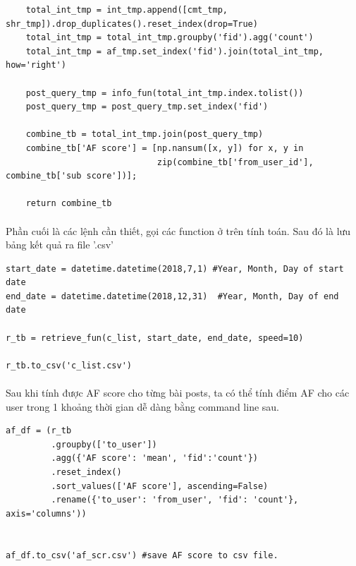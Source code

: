 \documentclass[12pt]{article}
\numberwithin{equation}{section}
\begin{document}
\begin{lstlisting}
    total_int_tmp = int_tmp.append([cmt_tmp, shr_tmp]).drop_duplicates().reset_index(drop=True)
    total_int_tmp = total_int_tmp.groupby('fid').agg('count')
    total_int_tmp = af_tmp.set_index('fid').join(total_int_tmp, how='right')

    post_query_tmp = info_fun(total_int_tmp.index.tolist())
    post_query_tmp = post_query_tmp.set_index('fid')

    combine_tb = total_int_tmp.join(post_query_tmp)
    combine_tb['AF score'] = [np.nansum([x, y]) for x, y in
                              zip(combine_tb['from_user_id'], combine_tb['sub score'])];

    return combine_tb
\end{lstlisting}

\paragraph{} Phần cuối là các lệnh cần thiết, gọi các function ở trên tính toán. Sau đó là lưu bảng kết quả ra file '.csv'
\\

\begin{lstlisting}
start_date = datetime.datetime(2018,7,1) #Year, Month, Day of start date
end_date = datetime.datetime(2018,12,31)  #Year, Month, Day of end date

r_tb = retrieve_fun(c_list, start_date, end_date, speed=10)

r_tb.to_csv('c_list.csv')
\end{lstlisting}

\paragraph{} Sau khi tính được AF score cho từng bài posts, ta có thể tính điểm AF cho các user trong 1 khoảng thời gian dễ dàng bằng command line sau.

\begin{lstlisting}
af_df = (r_tb
         .groupby(['to_user'])
         .agg({'AF score': 'mean', 'fid':'count'})
         .reset_index()
         .sort_values(['AF score'], ascending=False)
         .rename({'to_user': 'from_user', 'fid': 'count'}, axis='columns'))


af_df.to_csv('af_scr.csv') #save AF score to csv file.
\end{lstlisting}

\nocite{*}


\end{document}
